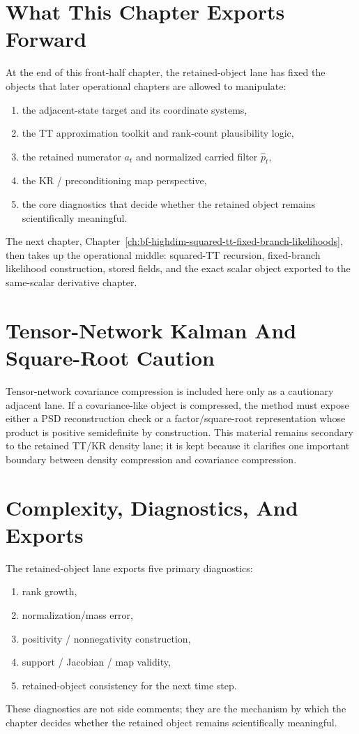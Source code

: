 \section{What This Chapter Exports Forward}
\label{sec:bf-hd-ttkr-front-half-exports}

At the end of this front-half chapter, the retained-object lane has fixed the
objects that later operational chapters are allowed to manipulate:
\begin{enumerate}[leftmargin=0.28in]
  \item the adjacent-state target and its coordinate systems,
  \item the TT approximation toolkit and rank-count plausibility logic,
  \item the retained numerator \(a_t\) and normalized carried filter
  \(\widehat p_t\),
  \item the KR / preconditioning map perspective,
  \item the core diagnostics that decide whether the retained object remains
  scientifically meaningful.
\end{enumerate}
The next chapter,
Chapter~\ref{ch:bf-highdim-squared-tt-fixed-branch-likelihoods}, then takes up
the operational middle: squared-TT recursion, fixed-branch likelihood
construction, stored fields, and the exact scalar object exported to the
same-scalar derivative chapter.

\section{Tensor-Network Kalman And Square-Root Caution}
\label{sec:bf-hd-tn-kalman}

Tensor-network covariance compression is included here only as a cautionary
adjacent lane.  If a covariance-like object is compressed, the method must expose
either a PSD reconstruction check or a factor/square-root representation whose
product is positive semidefinite by construction.  This material remains
secondary to the retained TT/KR density lane; it is kept because it clarifies one
important boundary between density compression and covariance compression.

\section{Complexity, Diagnostics, And Exports}
\label{sec:bf-hd-ttkr-complexity}

The retained-object lane exports five primary diagnostics:
\begin{enumerate}[label=(\arabic*), leftmargin=0.28in]
  \item rank growth,
  \item normalization/mass error,
  \item positivity / nonnegativity construction,
  \item support / Jacobian / map validity,
  \item retained-object consistency for the next time step.
\end{enumerate}
These diagnostics are not side comments; they are the mechanism by which the
chapter decides whether the retained object remains scientifically meaningful.

